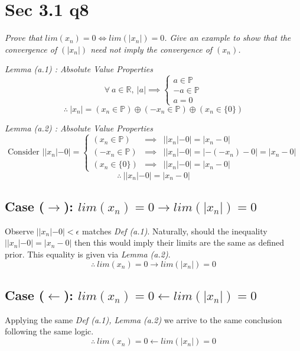 \documentclass[11pt]{article}
\newcommand{\question}[1]{
    \begin{mdframed}[
        linecolor=gray,       %
        linewidth=0.5pt,      %
        innertopmargin=10pt,  %
        innerbottommargin=10pt %
    ]
    \centering \itshape #1
    \end{mdframed}
}
\newcommand{\subp}[1]{
    \begin{mdframed}[
        linewidth=0.5pt,      %
        innertopmargin=10pt,  %
        innerbottommargin=10pt %
    ]
    \centering \itshape #1
    \end{mdframed}
}
\theoremstyle{plain}
\begin{document}
\section*{ Sec 3.1 q8}
\question{ Prove that $lim(x_n) = 0 \iff lim(|x_n|)=0$. Give an example to show that the convergence of $(|x_n|)$ need not imply the convergence of $(x_n)$. }
\vspace{10pt}
\subp{
	Lemma (a.1) : \small{Absolute Value Properties}
	\[
		\forall ~a \in \mathbb{R}, ~|a| \implies
		\left \{
		\begin{array}{cc}
			a \in \mathbb{P}  \\
			-a \in \mathbb{P} \\
			a = 0 
		\end{array}
		\right .
	\]
	$$\therefore ~|x_n| = (x_n \in \mathbb{P}) \oplus (-x_n \in \mathbb{P}) \oplus (x_n \in \{ 0 \})$$
} \vspace{1em}
\subp{
	Lemma (a.2) : \small{Absolute Value Properties}
	\[
		\text{Consider } ||x_n| - 0| =
		\left \{
		\begin{array}{ccc}
			(x_n \in \mathbb{P})  & \implies & ||x_n|-0| = |x_n - 0|               \\
			(-x_n \in \mathbb{P}) & \implies & ||x_n|-0| = |-(-x_n) - 0| = |x_n-0| \\
			(x_n \in \{ 0 \})     & \implies & ||x_n|-0| =  |x_n - 0|
		\end{array}
		\right .
	\]
	\[ \therefore ~||x_n|-0| = |x_n -0| \]
} \vspace{1em}
\subsection*{Case ($\rightarrow$): $lim(x_n) = 0 \rightarrow lim(|x_n|)=0$}

Observe $||x_n|-0| < \epsilon$ matches \textit{Def (a.1)}. Naturally, should the inequality $||x_n|-0| = |x_n-0|$ then this would imply their limits are the same as defined prior. This equality is given via \textit{Lemma (a.2)}.
\[ \therefore~ lim(x_n) = 0 \rightarrow lim(|x_n|)=0 \]
\subsection*{Case ($\leftarrow$): $lim(x_n) = 0 \leftarrow lim(|x_n|)=0$}
Applying the same \textit{Def (a.1), Lemma (a.2)} we arrive to the same conclusion following the same logic.
\[ \therefore~ lim(x_n) = 0 \leftarrow lim(|x_n|)=0 \]
\end{document}
